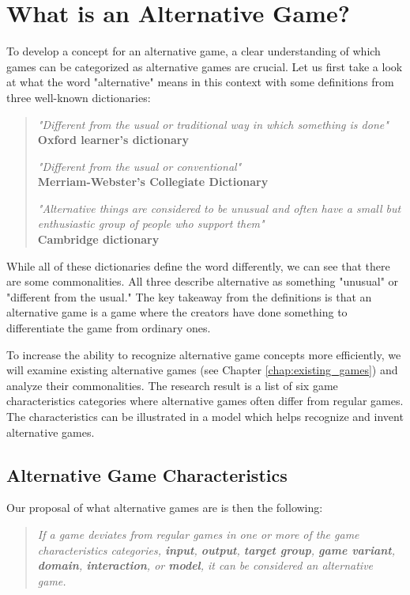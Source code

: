 \section{What is an Alternative Game?}
\label{chap:what_is_alternative_game}

To develop a concept for an alternative game, a clear understanding of which games can be categorized as alternative games are crucial. Let us first take a look at what the word "alternative" means in this context with some definitions from three well-known dictionaries:

\blockquote{
    \textit{"Different from the usual or traditional way in which something is done"} \\
    \textbf{Oxford learner's dictionary}
    
    \textit{"Different from the usual or conventional"} \\
    \textbf{Merriam-Webster's Collegiate Dictionary}
     
    \textit{"Alternative things are considered to be unusual and often have a small but enthusiastic group of people who support them"} \\
    \textbf{Cambridge dictionary}
}

While all of these dictionaries define the word differently, we can see that there are some commonalities. All three describe alternative as something "unusual" or "different from the usual." The key takeaway from the definitions is that an alternative game is a game where the creators have done something to differentiate the game from ordinary ones.

To increase the ability to recognize alternative game concepts more efficiently, we will examine existing alternative games (see Chapter \ref{chap:existing_games}) and analyze their commonalities. The research result is a list of six game characteristics categories where alternative games often differ from regular games. The characteristics can be illustrated in a model which helps recognize and invent alternative games.

\vspace*{-0.4\baselineskip}
\subsection{Alternative Game Characteristics}
Our proposal of what alternative games are is then the following:

\begin{quote}\textit{If a game deviates from regular games in one or more of the game characteristics categories, \textbf{input}, \textbf{output}, \textbf{target group}, \textbf{game variant}, \textbf{domain}, \textbf{interaction}, or \textbf{model}, it can be considered an alternative game.}\end{quote}

